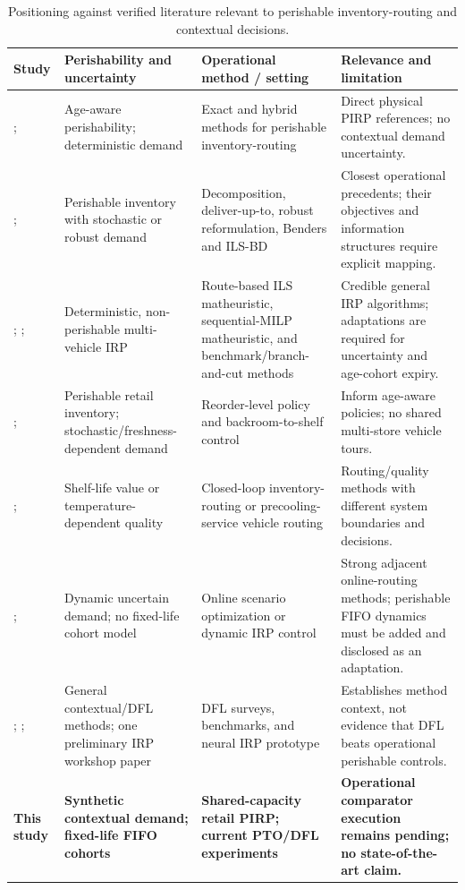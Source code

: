 \documentclass[11pt,a4paper]{article}
\theoremstyle{definition}
\theoremstyle{remark}
\begin{document}
\begin{table}[H]
\centering
\small
\caption{Positioning against verified literature relevant to perishable inventory-routing and contextual decisions.}
\label{tab:positioning}
\setlength{\tabcolsep}{4pt}
\begin{tabular}{p{3.3cm}p{3.4cm}p{4.4cm}p{4.5cm}}
\toprule
\textbf{Study} & \textbf{Perishability and uncertainty} & \textbf{Operational method / setting} & \textbf{Relevance and limitation} \\
\midrule
\citet{coelho2014optimal}; \citet{alvarez2020formulations} & Age-aware perishability; deterministic demand & Exact and hybrid methods for perishable inventory-routing & Direct physical PIRP references; no contextual demand uncertainty. \\
\citet{archetti2018stochastic}; \citet{he2024robust} & Perishable inventory with stochastic or robust demand & Decomposition, deliver-up-to, robust reformulation, Benders and ILS-BD & Closest operational precedents; their objectives and information structures require explicit mapping. \\
\citet{lagana2024ils}; \citet{solyali2022multi}; \citet{skalnes2024new} & Deterministic, non-perishable multi-vehicle IRP & Route-based ILS matheuristic, sequential-MILP matheuristic, and benchmark/branch-and-cut methods & Credible general IRP algorithms; adaptations are required for uncertainty and age-cohort expiry. \\
\citet{pilati2024environmentally}; \citet{senyuva2026perishable} & Perishable retail inventory; stochastic/freshness-dependent demand & Reorder-level policy and backroom-to-shelf control & Inform age-aware policies; no shared multi-store vehicle tours. \\
\citet{zhang2024closed}; \citet{lin2025precooling} & Shelf-life value or temperature-dependent quality & Closed-loop inventory-routing or precooling-service vehicle routing & Routing/quality methods with different system boundaries and decisions. \\
\citet{jia2025scenario}; \citet{lagos2026stochastic} & Dynamic uncertain demand; no fixed-life cohort model & Online scenario optimization or dynamic IRP control & Strong adjacent online-routing methods; perishable FIFO dynamics must be added and disclosed as an adaptation. \\
\citet{mandi2024decision}; \citet{sadana2025survey}; \citet{islam2023optimizing} & General contextual/DFL methods; one preliminary IRP workshop paper & DFL surveys, benchmarks, and neural IRP prototype & Establishes method context, not evidence that DFL beats operational perishable controls. \\
\textbf{This study} & \textbf{Synthetic contextual demand; fixed-life FIFO cohorts} & \textbf{Shared-capacity retail PIRP; current PTO/DFL experiments} & \textbf{Operational comparator execution remains pending; no state-of-the-art claim.} \\
\bottomrule
\end{tabular}
\end{table}
\end{document}
